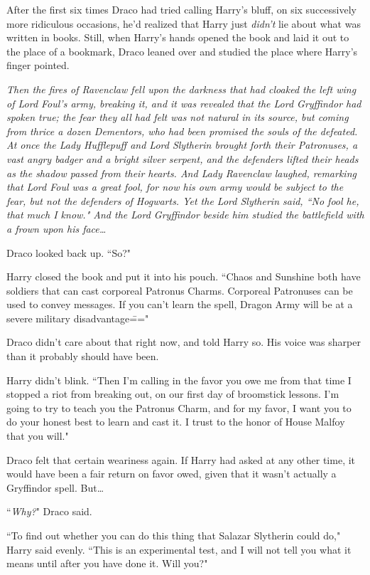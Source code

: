 After the first six times Draco had tried calling Harry's bluff, on six successively more ridiculous occasions, he'd realized that Harry just \emph{didn't} lie about what was written in books. Still, when Harry's hands opened the book and laid it out to the place of a bookmark, Draco leaned over and studied the place where Harry's finger pointed.

\emph{Then the fires of Ravenclaw fell upon the darkness that had cloaked the left wing of Lord Foul's army, breaking it, and it was revealed that the Lord Gryffindor had spoken true; the fear they all had felt was not natural in its source, but coming from thrice a dozen Dementors, who had been promised the souls of the defeated. At once the Lady Hufflepuff and Lord Slytherin brought forth their Patronuses, a vast angry badger and a bright silver serpent, and the defenders lifted their heads as the shadow passed from their hearts. And Lady Ravenclaw laughed, remarking that Lord Foul was a great fool, for now his own army would be subject to the fear, but not the defenders of Hogwarts. Yet the Lord Slytherin said, ``No fool he, that much I know." And the Lord Gryffindor beside him studied the battlefield with a frown upon his face{\ldots}}

Draco looked back up. ``So?"

Harry closed the book and put it into his pouch. ``Chaos and Sunshine both have soldiers that can cast corporeal Patronus Charms. Corporeal Patronuses can be used to convey messages. If you can't learn the spell, Dragon Army will be at a severe military disadvantage\==="

Draco didn't care about that right now, and told Harry so. His voice was sharper than it probably should have been.

Harry didn't blink. ``Then I'm calling in the favor you owe me from that time I stopped a riot from breaking out, on our first day of broomstick lessons. I'm going to try to teach you the Patronus Charm, and for my favor, I want you to do your honest best to learn and cast it. I trust to the honor of House Malfoy that you will."

Draco felt that certain weariness again. If Harry had asked at any other time, it would have been a fair return on favor owed, given that it wasn't actually a Gryffindor spell. But{\ldots}

``\emph{Why?}" Draco said.

``To find out whether you can do this thing that Salazar Slytherin could do," Harry said evenly. ``This is an experimental test, and I will not tell you what it means until after you have done it. Will you?"

